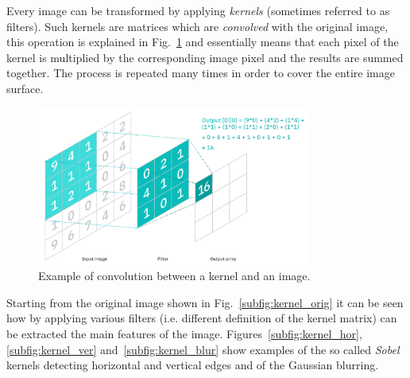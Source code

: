 Every image can be transformed by applying \emph{kernels} (sometimes referred to as filters). Such kernels are matrices which are \emph{convolved} with the original image, this operation is explained in Fig.~\ref{fig:convolution} and essentially means that each pixel of the kernel is multiplied by the corresponding image pixel and the results are summed together. The process is repeated many times in order to cover the entire image surface.

\begin{figure}[htb]
\centering
\includegraphics[width=0.8\textwidth]{figures/convolution}
\caption{Example of convolution between a kernel and an image.}
\label{fig:convolution}
\end{figure}

Starting from the original image shown in Fig.~\ref{subfig:kernel_orig} it can be seen how by applying various filters (i.e. different definition of the kernel matrix) can be extracted the main features of the image. Figures~\ref{subfig:kernel_hor}, \ref{subfig:kernel_ver} and~\ref{subfig:kernel_blur} show examples of the so called \emph{Sobel} kernels detecting horizontal and vertical edges and of the Gaussian blurring.

